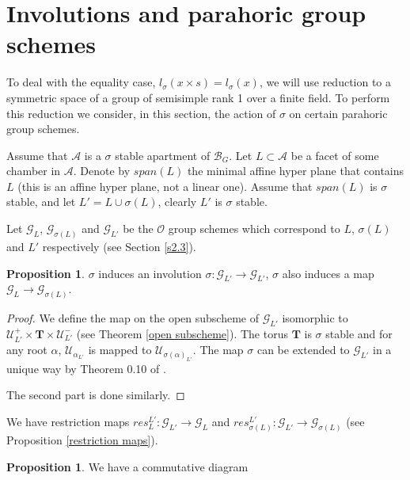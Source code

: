 \documentclass[12pt]{article}
\newcommand{\A}{\mathcal{A}}
\newcommand{\B}{\mathcal{B}}
\newcommand{\s}{\mathcal{O}}
\newcommand{\<}{\langle}
\renewcommand{\>}{\rangle}
\theoremstyle{plain}
\theoremstyle{definition}
\newtheorem{prop}[theorem]{Proposition}
\begin{document}
\section{Involutions and parahoric group schemes}

To deal with the equality case, $l_\sigma(x\times s)=l_\sigma(x)$, we will use reduction to a symmetric space of a group of semisimple rank 1 over a finite field. To perform this reduction we consider, in this section, the action of $\sigma$ on certain parahoric group schemes. 

Assume that $\A$ is a $\sigma$ stable apartment of $\B_G$. Let $L\subset \A$ be a facet of some chamber in $\A$. Denote by $span(L)$ the minimal affine hyper plane that contains $L$ (this is an affine hyper plane, not a linear one). Assume that $span(L)$ is $\sigma$ stable, and let $L'=L\cup \sigma(L)$, clearly $L'$ is $\sigma$ stable.

Let ${\mathcal G}_L$, ${\mathcal G}_{\sigma(L)}$ and ${\mathcal G}_{L'}$ be the $\s$ group schemes which correspond to $L$, $\sigma(L)$ and $L'$ respectively (see Section \ref{s2.3}).
\begin{prop}
    $\sigma$ induces an involution $\sigma: {\mathcal G}_{L'}\rightarrow {\mathcal G}_{L'}$, $\sigma$ also induces a map ${\mathcal G}_{L}\rightarrow {\mathcal G}_{\sigma(L)}$.
\end{prop}

\begin{proof}
    We define the map on the open subscheme of ${\mathcal G}_{L'}$ isomorphic to ${\mathcal U}^+_{L'}\times \mathbf{T}\times {\mathcal U}^-_{L'}$ (see Theorem \ref{open subscheme}). The torus $\mathbf{T}$ is $\sigma$ stable and for any root $\alpha$, ${\mathcal U}_{\alpha_{L'}}$ is mapped to ${\mathcal U}_{\sigma(\alpha)_{L'}}$. The map $\sigma$ can be extended to ${\mathcal G}_{L'}$ in a unique way by Theorem 0.10 of \cite{Landvogt1995ACO}.
    
    
    The second part is done similarly.
\end{proof}

We have restriction maps $res^{L'}_L:{\mathcal G}_{L'}\rightarrow {\mathcal G}_{L}$ and $res^{L'}_{\sigma(L)}:{\mathcal G}_{L'}\rightarrow {\mathcal G}_{\sigma(L)}$ (see Proposition \ref{restriction maps}).

\begin{prop}\label{commute}
    We have a commutative diagram
\begin{center}
    

\end{center}
    
\end{prop}
\end{document}
